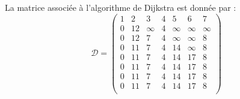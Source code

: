 \begin{solution}
\begin{solution}
\end{solution}
La matrice associée à l'algorithme de Dijkstra est donnée par : 
\[\mathcal{D}= 
\left(\begin{array}{ccccccc}
1 & 2   & 3       & 4  & 5          & 6 & 7 \\
\boxed{0} & 12 & \infty & 4 & \infty    &\infty & \infty  \\
\boxed{0} & 12 & 7       & \boxed{4} & \infty    & \infty  & 8  \\
\boxed{0} & 11 & \boxed{7}       &\boxed{4} & 14         & \infty  & 8\\
\boxed{0} & 11 & \boxed{7}       & \boxed{4}& 14         & 17 & \boxed{8}\\
\boxed{0} & \boxed{11} & \boxed{7}       & \boxed{4} & 14         & 17 &  \boxed{8}\\
\boxed{0} & \boxed{11} & \boxed{7}      & \boxed{4} & \boxed{14}         & 17 &  \boxed{8}\\
\boxed{0} & \boxed{11}& \boxed{7}       & \boxed{4} & \boxed{14}         & \boxed{17} &  \boxed{8}\\
\end{array}\right)\]

\end{solution}

